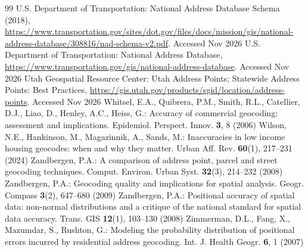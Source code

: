 \documentclass[runningheads]{llncs}
\begin{document}
\begin{thebibliography}{99}
 U.S. Department of Transportation: National Address Database Schema (2018), \url{https://www.transportation.gov/sites/dot.gov/files/docs/mission/gis/national-address-database/308816/nad-schema-v2.pdf}. Accessed Nov 2026
 U.S. Department of Transportation: National Address Database, \url{https://www.transportation.gov/gis/national-address-database}. Accessed Nov 2026
 Utah Geospatial Resource Center: Utah Address Points; Statewide Address Points: Best Practices, \url{https://gis.utah.gov/products/sgid/location/address-points}. Accessed Nov 2026
 Whitsel, E.A., Quibrera, P.M., Smith, R.L., Catellier, D.J., Liao, D., Henley, A.C., Heiss, G.: Accuracy of commercial geocoding: assessment and implications. Epidemiol. Perspect. Innov. \textbf{3}, 8 (2006)
 Wilson, N.E., Hankinson, M., Magazinnik, A., Sands, M.: Inaccuracies in low income housing geocodes: when and why they matter. Urban Aff. Rev. \textbf{60}(1), 217--231 (2024)
 Zandbergen, P.A.: A comparison of address point, parcel and street geocoding techniques. Comput. Environ. Urban Syst. \textbf{32}(3), 214--232 (2008)
 Zandbergen, P.A.: Geocoding quality and implications for spatial analysis. Geogr. Compass \textbf{3}(2), 647--680 (2009)
 Zandbergen, P.A.: Positional accuracy of spatial data: non-normal distributions and a critique of the national standard for spatial data accuracy. Trans. GIS \textbf{12}(1), 103--130 (2008)
 Zimmerman, D.L., Fang, X., Mazumdar, S., Rushton, G.: Modeling the probability distribution of positional errors incurred by residential address geocoding. Int. J. Health Geogr. \textbf{6}, 1 (2007)
\end{thebibliography}
\end{document}
